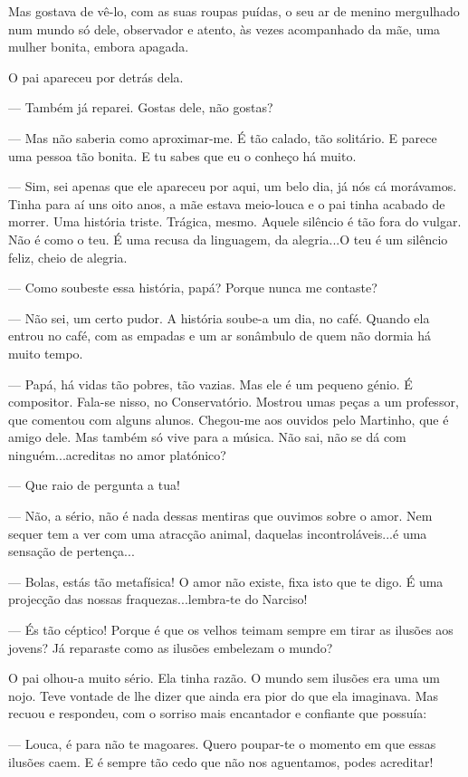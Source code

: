 Mas gostava de vê-lo, com as suas roupas puídas, o seu ar de menino
mergulhado num mundo só dele, observador e atento, às vezes acompanhado
da mãe, uma mulher bonita, embora apagada.

O pai apareceu por detrás dela.

--- Também já reparei. Gostas dele, não gostas?

--- Mas não saberia como aproximar-me. É tão calado, tão solitário. E
parece uma pessoa tão bonita. E tu sabes que eu o conheço há muito.

--- Sim, sei apenas que ele apareceu por aqui, um belo dia, já nós cá
morávamos. Tinha para aí uns oito anos, a mãe estava meio-louca e o pai
tinha acabado de morrer. Uma história triste. Trágica, mesmo. Aquele
silêncio é tão fora do vulgar. Não é como o teu. É uma recusa da
linguagem, da alegria...O teu é um silêncio feliz, cheio de alegria.

--- Como soubeste essa história, papá? Porque nunca me contaste?

--- Não sei, um certo pudor. A história soube-a um dia, no café. Quando
ela entrou no café, com as empadas e um ar sonâmbulo de quem não dormia
há muito tempo.

--- Papá, há vidas tão pobres, tão vazias. Mas ele é um pequeno génio. É
compositor. Fala-se nisso, no Conservatório. Mostrou umas peças a um
professor, que comentou com alguns alunos. Chegou-me aos ouvidos pelo
Martinho, que é amigo dele. Mas também só vive para a música. Não sai,
não se dá com ninguém...acreditas no amor platónico?

--- Que raio de pergunta a tua!

--- Não, a sério, não é nada dessas mentiras que ouvimos sobre o amor. Nem
sequer tem a ver com uma atracção animal, daquelas incontroláveis...é
uma sensação de pertença...

--- Bolas, estás tão metafísica! O amor não existe, fixa isto que te digo.
É uma projecção das nossas fraquezas...lembra-te do Narciso!

--- És tão céptico! Porque é que os velhos teimam sempre em tirar as
ilusões aos jovens? Já reparaste como as ilusões embelezam o mundo?

O pai olhou-a muito sério. Ela tinha razão. O mundo sem ilusões era uma
um nojo. Teve vontade de lhe dizer que ainda era pior do que ela
imaginava. Mas recuou e respondeu, com o sorriso mais encantador e
confiante que possuía:

--- Louca, é para não te magoares. Quero poupar-te o momento em que essas
ilusões caem. E é sempre tão cedo que não nos aguentamos, podes
acreditar!

